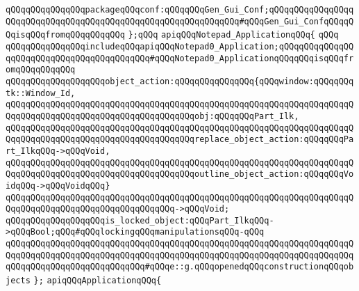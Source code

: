 \newline
\verb|qQQqqQQqqQQqqQQqpackageqQQqconf:qQQqqQQqGen_Gui_Conf;qQQqqQQqqQQqqQQqqQQqqQQqqQQqqQQqqQQqqQQqqQQqqQQqqQQqqQQqqQQqqQQq#qQQqGen_Gui_ConfqQQqqQQqisqQQqfromqQQqqQQqqQQq|\newline
\verb|};qQQq|\newline
\newline
\newline
\verb|apiqQQqNotepad_ApplicationqQQq{|\newline
\verb|qQQq|\newline
\verb|qQQqqQQqqQQqqQQqincludeqQQqapiqQQqNotepad0_Application;qQQqqQQqqQQqqQQqqQQqqQQqqQQqqQQqqQQqqQQqqQQq#qQQqNotepad0_ApplicationqQQqqQQqisqQQqfromqQQqqQQqqQQq|\newline
\newline
\verb|qQQqqQQqqQQqqQQqqQQqobject_action:qQQqqQQqqQQqqQQq{qQQqwindow:qQQqqQQqtk::Window_Id,|\newline
\verb|qQQqqQQqqQQqqQQqqQQqqQQqqQQqqQQqqQQqqQQqqQQqqQQqqQQqqQQqqQQqqQQqqQQqqQQqqQQqqQQqqQQqqQQqqQQqqQQqqQQqqQQqqQQqobj:qQQqqQQqPart_Ilk,|\newline
\verb|qQQqqQQqqQQqqQQqqQQqqQQqqQQqqQQqqQQqqQQqqQQqqQQqqQQqqQQqqQQqqQQqqQQqqQQqqQQqqQQqqQQqqQQqqQQqqQQqqQQqqQQqqQQqreplace_object_action:qQQqqQQqPart_IlkqQQq->qQQqVoid,|\newline
\verb|qQQqqQQqqQQqqQQqqQQqqQQqqQQqqQQqqQQqqQQqqQQqqQQqqQQqqQQqqQQqqQQqqQQqqQQqqQQqqQQqqQQqqQQqqQQqqQQqqQQqqQQqqQQqoutline_object_action:qQQqqQQqVoidqQQq->qQQqVoidqQQq}|\newline
\verb|qQQqqQQqqQQqqQQqqQQqqQQqqQQqqQQqqQQqqQQqqQQqqQQqqQQqqQQqqQQqqQQqqQQqqQQqqQQqqQQqqQQqqQQqqQQqqQQqqQQqqQQq->qQQqVoid;|\newline
\newline
\verb|qQQqqQQqqQQqqQQqqQQqis_locked_object:qQQqPart_IlkqQQq->qQQqBool;qQQq#qQQqlockingqQQqmanipulationsqQQq-qQQq|\newline
\verb|qQQqqQQqqQQqqQQqqQQqqQQqqQQqqQQqqQQqqQQqqQQqqQQqqQQqqQQqqQQqqQQqqQQqqQQqqQQqqQQqqQQqqQQqqQQqqQQqqQQqqQQqqQQqqQQqqQQqqQQqqQQqqQQqqQQqqQQqqQQqqQQqqQQqqQQqqQQqqQQqqQQqqQQq#qQQqe::g.qQQqopenedqQQqconstructionqQQqobjects|\newline
\newline
\verb|};|\newline
\newline
\verb|apiqQQqApplicationqQQq{|\newline
